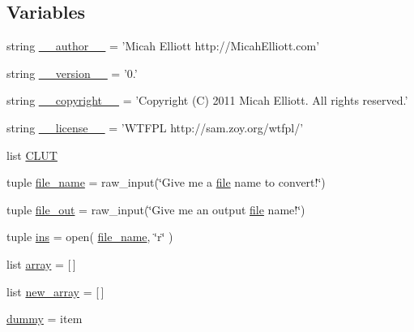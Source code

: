 \subsection*{Variables}
\begin{DoxyCompactItemize}
\item 
string \hyperlink{namespacehtml__to__bash__ascii__converter_ada82e810207023e3a203646f9a522180}{\-\_\-\-\_\-author\-\_\-\-\_\-} = 'Micah Elliott http\-://Micah\-Elliott.\-com'
\item 
string \hyperlink{namespacehtml__to__bash__ascii__converter_a937fe091f7f5049b61c912d08f211cd7}{\-\_\-\-\_\-version\-\_\-\-\_\-} = '0.'
\item 
string \hyperlink{namespacehtml__to__bash__ascii__converter_a0d3762ea7dad16c05073a567ff6d0d0e}{\-\_\-\-\_\-copyright\-\_\-\-\_\-} = 'Copyright (C) 2011 Micah Elliott. All rights reserved.'
\item 
string \hyperlink{namespacehtml__to__bash__ascii__converter_add6f787e8185652126e45cf581b34d32}{\-\_\-\-\_\-license\-\_\-\-\_\-} = 'W\-T\-F\-P\-L http\-://sam.\-zoy.\-org/wtfpl/'
\item 
list \hyperlink{namespacehtml__to__bash__ascii__converter_aca623d307673341a5040390d44ab99ba}{C\-L\-U\-T}
\item 
tuple \hyperlink{namespacehtml__to__bash__ascii__converter_acbc9db9cfd7871bf001658ddbadf55d5}{file\-\_\-name} = raw\-\_\-input(\char`\"{}Give me a \hyperlink{namespacehtml__to__bash__ascii__converter_a581541bd272af45521cffc96b1460d6a}{file} name to convert!\char`\"{})
\item 
tuple \hyperlink{namespacehtml__to__bash__ascii__converter_a1c2d3151ba54e82095aeb258aad527ea}{file\-\_\-out} = raw\-\_\-input(\char`\"{}Give me an output \hyperlink{namespacehtml__to__bash__ascii__converter_a581541bd272af45521cffc96b1460d6a}{file} name!\char`\"{})
\item 
tuple \hyperlink{namespacehtml__to__bash__ascii__converter_afb34cd1d39ae35f71c6a5d6d0b7419e3}{ins} = open( \hyperlink{namespacehtml__to__bash__ascii__converter_acbc9db9cfd7871bf001658ddbadf55d5}{file\-\_\-name}, \char`\"{}r\char`\"{} )
\item 
list \hyperlink{namespacehtml__to__bash__ascii__converter_ad57a10a30c2373374b5b77aee25d400f}{array} = \mbox{[}$\,$\mbox{]}
\item 
list \hyperlink{namespacehtml__to__bash__ascii__converter_ad4cf37b49af00dca8d9496f17fdae9e7}{new\-\_\-array} = \mbox{[}$\,$\mbox{]}
\item 
\hyperlink{namespacehtml__to__bash__ascii__converter_a96e43cec76ccd1749dad1dfff3033b3a}{dummy} = item

\end{DoxyCompactItemize}

